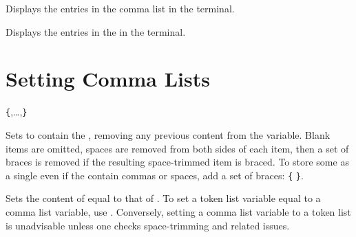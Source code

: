 \documentclass[oneside]{book}
\begin{document}
\begin{function}{\clistShow}
\begin{syntax}
 
\end{syntax}
Displays the entries in the comma list in the terminal.
\begin{codehigh}
\end{codehigh}
\end{function}

\begin{function}{\clistVarShow}
\begin{syntax}
 
\end{syntax}
Displays the entries in the  in the terminal.
\begin{codehigh}
\clistSet {}
\clistVarShow \lTmpaClist
\end{codehigh}
\end{function}

\section{Setting Comma Lists}

\begin{function}{\clistSet}
\begin{syntax}
  \verb|{|,\ldots{},\verb|}|
\end{syntax}
Sets  to contain the ,
removing any previous content from the variable.
Blank items are omitted, spaces are removed from both sides of each
item, then a set of braces is removed if the resulting space-trimmed
item is braced.
To store some  as a single  even if the
 contain commas or spaces, add a set of braces:
  \verb|{|  \verb|}|.
\begin{demohigh}
\clistSet {}
\clistVarJoin {}
\end{demohigh}
\end{function}

\begin{function}{\clistSetEq}
\begin{syntax}
  
\end{syntax}
Sets the content of  equal to that of
.  To set a token list variable equal to a comma
list variable, use .  Conversely, setting a comma
list variable to a token list is unadvisable unless one checks
space-trimming and related issues.
\begin{demohigh}
\clistSet {}
\clistSetEq \lTmpbClist \lTmpaClist
\clistVarJoin {}
\end{demohigh}
\end{function}
\end{document}

